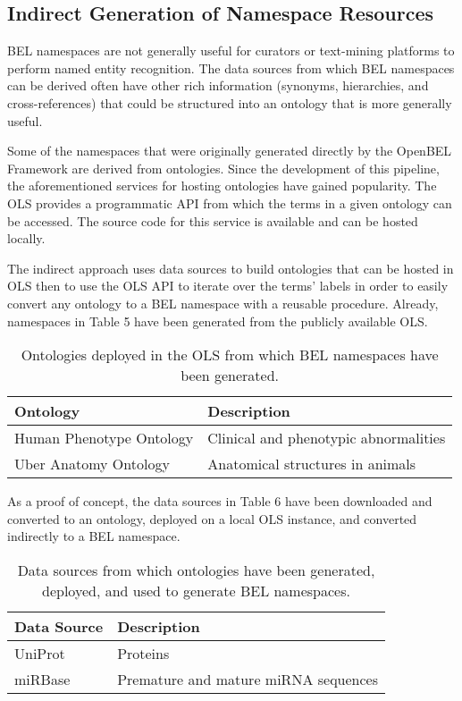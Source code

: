 \subsection{Indirect Generation of Namespace Resources}

BEL namespaces are not generally useful for curators or text-mining platforms to perform named entity recognition. The data sources from which BEL namespaces can be derived often have other rich information (synonyms, hierarchies, and cross-references) that could be structured into an ontology that is more generally useful. 

Some of the namespaces that were originally generated directly by the OpenBEL Framework are derived from ontologies. Since the development of this pipeline, the aforementioned services for hosting ontologies have gained popularity. The \ac{OLS} provides a programmatic \ac{API} from which the terms in a given ontology can be accessed. The source code for this service is available and can be hosted locally. 

The indirect approach uses data sources to build ontologies that can be hosted in \ac{OLS} then to use the \ac{OLS} \ac{API} to iterate over the terms' labels in order to easily convert any ontology to a BEL namespace with a reusable procedure. Already, namespaces in Table 5 have been generated from the publicly available \ac{OLS}. 

\begin{table}
\centering
\caption[OLS-Mediated Namespace Generation]{Ontologies deployed in the OLS from which BEL namespaces have been generated.}
\label{tab:indirect_namespace_generation}
\def\arraystretch{1.2}
\begin{tabular}{p{6cm} p{8cm}}
Ontology & Description \\
\hline
Human Phenotype Ontology & Clinical and phenotypic abnormalities \\
Uber Anatomy Ontology & Anatomical structures in animals
\end{tabular}
\end{table}

As a proof of concept, the data sources in Table 6 have been downloaded and converted to an ontology, deployed on a local \ac{OLS} instance, and converted indirectly to a BEL namespace.

\begin{table}
\centering
\caption[Indirect Namespace Generation]{Data sources from which ontologies have been generated, deployed, and used to generate BEL namespaces.}
\label{tab:indirect_ols_namespace_generation}
\def\arraystretch{1.5}
\begin{tabular}{p{6cm} p{8cm}}
Data Source & Description \\
\hline
\ac{UniProt} & Proteins \\
miRBase & Premature and mature \ac{miRNA} sequences
\end{tabular}
\end{table}

